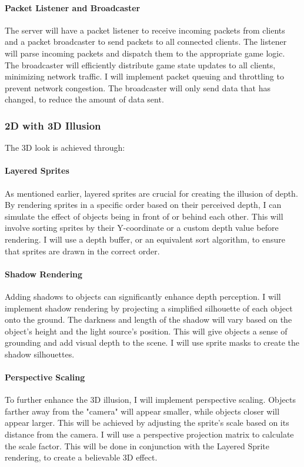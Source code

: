 \documentclass{article}
\begin{document}
\paragraph{Packet Listener and Broadcaster}
The server will have a packet listener to receive incoming packets from clients and a packet broadcaster to send packets to all connected clients. The listener will parse incoming packets and dispatch them to the appropriate game logic. The broadcaster will efficiently distribute game state updates to all clients, minimizing network traffic. I will implement packet queuing and throttling to prevent network congestion. The broadcaster will only send data that has changed, to reduce the amount of data sent.

\subsubsection{2D with 3D Illusion}

The 3D look is achieved through:

\paragraph{Layered Sprites}
As mentioned earlier, layered sprites are crucial for creating the illusion of depth. By rendering sprites in a specific order based on their perceived depth, I can simulate the effect of objects being in front of or behind each other. This will involve sorting sprites by their Y-coordinate or a custom depth value before rendering. I will use a depth buffer, or an equivalent sort algorithm, to ensure that sprites are drawn in the correct order.

\paragraph{Shadow Rendering}
Adding shadows to objects can significantly enhance depth perception. I will implement shadow rendering by projecting a simplified silhouette of each object onto the ground. The darkness and length of the shadow will vary based on the object's height and the light source's position. This will give objects a sense of grounding and add visual depth to the scene. I will use sprite masks to create the shadow silhouettes.

\paragraph{Perspective Scaling}
To further enhance the 3D illusion, I will implement perspective scaling. Objects farther away from the "camera" will appear smaller, while objects closer will appear larger. This will be achieved by adjusting the sprite's scale based on its distance from the camera. I will use a perspective projection matrix to calculate the scale factor. This will be done in conjunction with the Layered Sprite rendering, to create a believable 3D effect.
\end{document}
